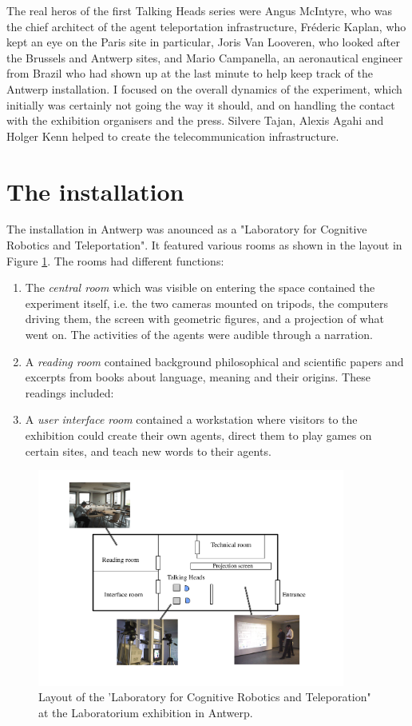The real heros of the first Talking Heads series were
Angus McIntyre, who was the chief architect of the agent teleportation infrastructure, 
Fr\'{e}deric Kaplan, who kept an eye on the Paris site in particular, Joris Van Looveren, who looked after the 
Brussels and Antwerp sites, and Mario Campanella, an aeronautical engineer from Brazil who 
had shown up at the last minute to 
help keep track of the Antwerp installation. I focused on the overall dynamics of the experiment, which 
initially was certainly not going the way it should, and on handling the contact with the exhibition organisers and 
the press. Silvere Tajan, Alexis Agahi and Holger Kenn helped to create the telecommunication infrastructure. 
\section{The installation}

The installation in Antwerp was anounced as a "Laboratory for Cognitive Robotics and Teleportation".\cite{Steels:99b}
It featured various rooms as shown in the layout in Figure \ref{fig:layout}. The rooms had different functions: 
\begin{enumerate} 
\item The {\it central room} which was visible on entering the space contained the experiment itself, i.e. the 
two cameras mounted on tripods, the computers driving them, the screen with geometric figures, and a projection of 
what went on. The activities of the agents were audible through a narration. 
\item A {\it reading room} contained background philosophical and scientific 
papers and excerpts from books about language, meaning and their origins. These readings included: 
\item A {\it user interface room} contained a workstation where visitors to the exhibition could create their own 
agents, direct them to play games on certain sites, and teach new words to their agents. 
\end{enumerate}
\begin{figure}[htbp]
  \centerline{\includegraphics[width=0.9\textwidth]{chap8/figures/layout}}
\caption{\footnotesize\label{fig:layout} 
Layout of the 'Laboratory for Cognitive Robotics and Teleporation" at the Laboratorium exhibition in Antwerp.}
\end{figure}

